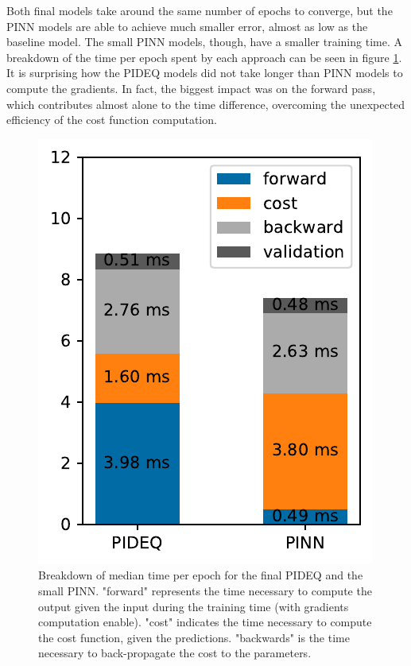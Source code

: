 Both final models take around the same number of epochs to converge, but the \gls{PINN} models are able to achieve much smaller error, almost as low as the baseline model.
The small \gls{PINN} models, though, have a smaller training time.
A breakdown of the time per epoch spent by each approach can be seen in figure \ref{fig:final-times}.
It is surprising how the \gls{PIDEQ} models did not take longer than \gls{PINN} models to compute the gradients.
In fact, the biggest impact was on the forward pass, which contributes almost alone to the time difference, overcoming the unexpected efficiency of the cost function computation. 

\begin{figure}[h]
    \centering
    \includegraphics{images/final_times.pdf}
    \caption{Breakdown of median time per epoch for the final \gls{PIDEQ} and the small \gls{PINN}. "forward" represents the time necessary to compute the output given the input during the training time (with gradients computation enable). "cost" indicates the time necessary to compute the cost function, given the predictions. "backwards" is the time necessary to back-propagate the cost to the parameters.}
    \label{fig:final-times}
\end{figure}

